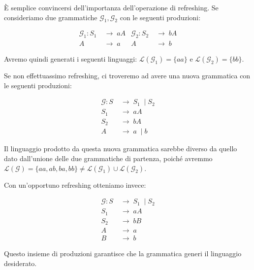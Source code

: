 \documentclass[class=book, crop=false, oneside, 12pt]{standalone}
\begin{document}
\begin{osservazione}
  È semplice convincersi dell'importanza dell'operazione di refreshing. Se consideriamo due grammatiche \(\mathcal{G}_1, \mathcal{G}_2\) con le seguenti produzioni:

  \begin{align*}
    \mathcal{G}_1: S_1\; &\to\; aA & \mathcal{G}_2: S_2\; &\to\; bA \\
    A\; &\to\; a & A\; &\to\; b
  \end{align*}

  \noindent Avremo quindi generati i seguenti linguaggi: \(\mathcal{L}(\mathcal{G}_1)  = \{aa\}\) e \(\mathcal{L}(\mathcal{G}_2)  = \{bb\}\).

  Se non effettuassimo refreshing, ci troveremo ad avere una nuova grammatica con le seguenti produzioni:

  \begin{align*}
    \mathcal{G}: S\; &\to\; S_1\; \mid S_2 \\
    S_1\; &\to\; aA \\
    S_2\; &\to\; bA \\
    A\; &\to\; a\; \mid b
  \end{align*}

  \noindent Il linguaggio prodotto da questa nuova grammatica sarebbe diverso da quello dato dall'unione delle due grammatiche di partenza, poiché avremmo \(\mathcal{L(G)} = \{aa, ab, ba, bb\} \neq \mathcal{L}(\mathcal{G}_1)  \cup \mathcal{L}(\mathcal{G}_2) \).

  Con un'opportuno refreshing otteniamo invece:

  \begin{align*}
    \mathcal{G}: S\; &\to\; S_1\; \mid S_2 \\
    S_1\; &\to\; aA \\
    S_2\; &\to\; bB \\
    A\; &\to\; a \\
    B\; &\to\; b
  \end{align*}

  Questo insieme di produzioni garantisce che la grammatica generi il linguaggio desiderato.
\end{osservazione}
\end{document}
